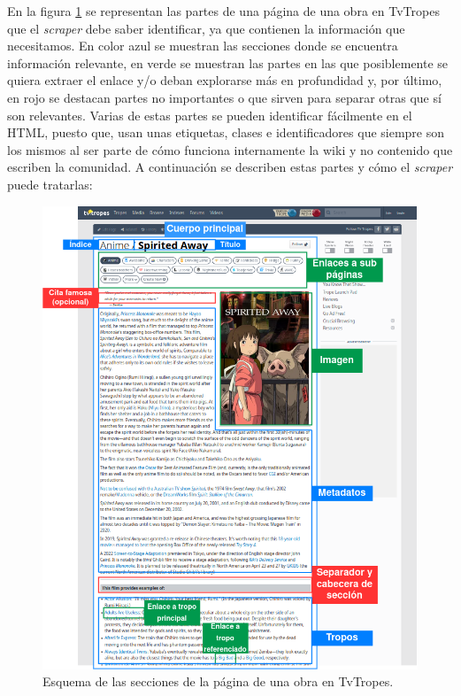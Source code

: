 En la figura \ref{fig:tvtropes-work} se representan las partes de una página de
una obra en TvTropes que el \textit{scraper} debe saber identificar, ya que
contienen la información que necesitamos. En color azul se muestran las
secciones donde se encuentra información relevante, en verde se muestran las
partes en las que posiblemente se quiera extraer el enlace y/o deban explorarse
más en profundidad y, por último, en rojo se destacan partes no importantes o
que sirven para separar otras que sí son relevantes. Varias de estas partes se
pueden identificar fácilmente en el HTML, puesto que, usan unas etiquetas,
clases e identificadores que siempre son los mismos al ser parte de cómo
funciona internamente la wiki y no contenido que escriben la comunidad. A
continuación se describen estas partes y cómo el \textit{scraper} puede
tratarlas:

\begin{figure}[!h]
  \centering
  \includegraphics[width=\textwidth]{img/esquema-obra.png}
  \caption{Esquema de las secciones de la página de una obra en TvTropes.}
  \label{fig:tvtropes-work}
\end{figure}

